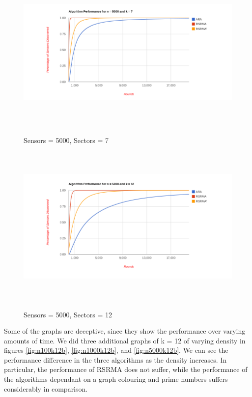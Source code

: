 \begin{figure}[ht]
\caption{Sensors = 5000, Sectors = 7}
\includegraphics[height = 8cm]{pics/graph5000k7.png}\\[0.5cm]   
\label{fig:n10k7} 
\end{figure}

\begin{figure}[ht]
\caption{Sensors = 5000, Sectors = 12}
\includegraphics[height = 8cm]{pics/graph5000k12.png}\\[0.5cm] 
\label{fig:n10k12}   
\end{figure}

\newpage

Some of the graphs are deceptive, since they show the performance over varying amounts of time.
We did three additional graphs of k = 12 of varying density in figures \ref{fig:n100k12b}, 
\ref{fig:n1000k12b}, and \ref{fig:n5000k12b}. We can see the performance difference in the three algorithms as the density increases. In particular, the performance of RSRMA does not suffer, while the performance of the algorithms dependant on a graph colouring and prime numbers suffers considerably in comparison.

